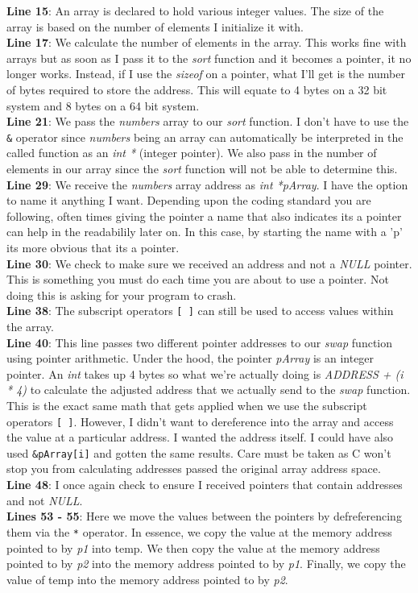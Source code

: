 \documentclass[../main.tex]{subfiles}
\begin{document}
	\textbf{Line 15}: An array is declared to hold various integer values. The size of the array is based on the number of elements I initialize it with.\\
	\textbf{Line 17}: We calculate the number of elements in the array.  This works fine with arrays but as soon as I pass it to the \textit{sort} function and it becomes a pointer, it no longer works\cite{embedded_c}.  Instead, if I use the \textit{sizeof} on a pointer, what I'll get is the number of bytes required to store the address.  This will equate to 4 bytes on a 32 bit system and 8 bytes on a 64 bit system.\\
	\textbf{Line 21}: We pass the \textit{numbers} array to our \textit{sort} function.  I don't have to use the \texttt{\&} operator since \textit{numbers} being an array can automatically be interpreted in the called function as an \textit{int *} (integer pointer).  We also pass in the number of elements in our array since the \textit{sort} function will not be able to determine this.\\
	\textbf{Line 29}: We receive the \textit{numbers} array address as \textit{int *pArray}.  I have the option to name it anything I want.  Depending upon the coding standard you are following, often times giving the pointer a name that also indicates its a pointer can help in the readabilily later on\cite{embedded_c}. In this case, by starting the name with a 'p' its more obvious that its a pointer.\\
	\textbf{Line 30}: We check to make sure we received an address and not a \textit{NULL} pointer. This is something you must do each time you are about to use a pointer.  Not doing this is asking for your program to crash.\\
	\textbf{Line 38}: The subscript operators \texttt{[ ]} can still be used to access values within the array.\\
	\textbf{Line 40}: This line passes two different pointer addresses to our \textit{swap} function using pointer arithmetic.  Under the hood, the pointer \textit{pArray} is an integer pointer.  An \textit{int} takes up 4 bytes so what we're actually doing is \textit{ADDRESS + (i * 4)} to calculate the adjusted address that we actually send to the \textit{swap} function.  This is the exact same math that gets applied when we use the subscript operators \texttt{[ ]}.  However, I didn't want to dereference into the array and access the value at a particular address.  I wanted the address itself.  I could have also used \texttt{\&pArray[i]} and gotten the same results. Care must be taken as C won't stop you from calculating addresses passed the original array address space.\\
	\textbf{Line 48}: I once again check to ensure I received pointers that contain addresses and not \textit{NULL}.\\
	\textbf{Lines 53 - 55}: Here we move the values between the pointers by defreferencing them via the \texttt{*} operator.  In essence, we copy the value at the memory address pointed to by \textit{p1} into temp.  We then copy the value at the memory address pointed to by \textit{p2} into the memory address pointed to by \textit{p1}.  Finally, we copy the value of temp into the memory address pointed to by \textit{p2}.\\
	
\end{document}

